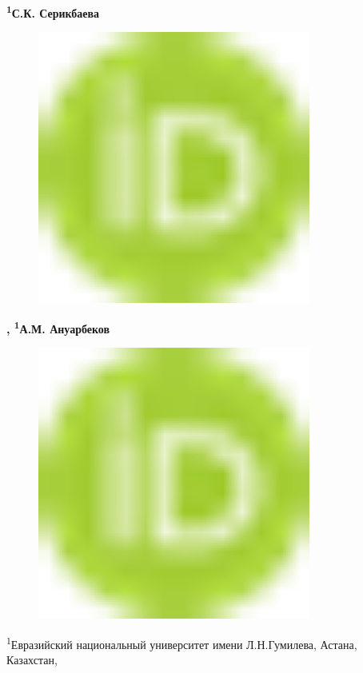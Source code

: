{\bfseries \textsuperscript{1}С.К.
Серикбаева}
\begin{figure}[H]
	\centering
	\includegraphics[width=0.8\textwidth]{media/ict/image16}
	\caption*{}
\end{figure}
{\bfseries \textsuperscript{\envelope },
\textsuperscript{1}А.М.
Ануарбеков}
\begin{figure}[H]
	\centering
	\includegraphics[width=0.8\textwidth]{media/ict/image16}
	\caption*{}
\end{figure}


\textsuperscript{1}Евразийский национальный университет имени
Л.Н.Гумилева, Астана, Казахстан,

